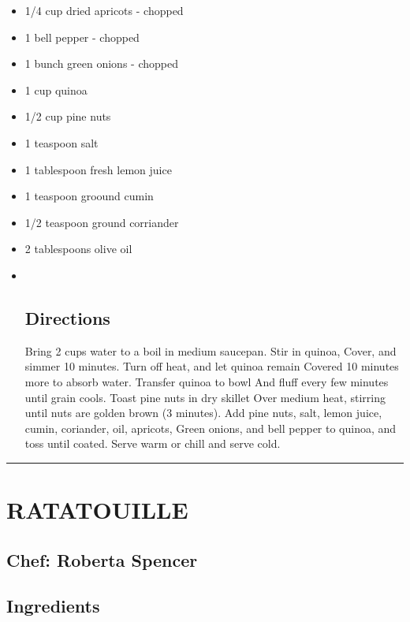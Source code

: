 \documentclass[
]{book}
\begin{document}
\begin{itemize}
\item
  1/4 cup dried apricots - chopped
\item
  1 bell pepper - chopped
\item
  1 bunch green onions - chopped
\item
  1 cup quinoa
\item
  1/2 cup pine nuts
\item
  1 teaspoon salt
\item
  1 tablespoon fresh lemon juice
\item
  1 teaspoon groound cumin
\item
  1/2 teaspoon ground corriander
\item
  2 tablespoons olive oil
\item ~
  \hypertarget{directions-35}{%
  \subsection*{Directions}\label{directions-35}}

  Bring 2 cups water to a boil in medium saucepan. Stir in quinoa,
  Cover, and simmer 10 minutes. Turn off heat, and let quinoa remain
  Covered 10 minutes more to absorb water. Transfer quinoa to bowl
  And fluff every few minutes until grain cools. Toast pine nuts in dry skillet
  Over medium heat, stirring until nuts are golden brown (3 minutes).
  Add pine nuts, salt, lemon juice, cumin, coriander, oil, apricots,
  Green onions, and bell pepper to quinoa, and toss until coated.
  Serve warm or chill and serve cold.
\end{itemize}

\begin{center}\rule{0.5\linewidth}{0.5pt}\end{center}

\hypertarget{ratatouille}{%
\section*{RATATOUILLE}\label{ratatouille}}


\hypertarget{chef-roberta-spencer-10}{%
\subsection*{Chef: Roberta Spencer}\label{chef-roberta-spencer-10}}


\hypertarget{ingredients-36}{%
\subsection*{Ingredients}\label{ingredients-36}}
\end{document}
